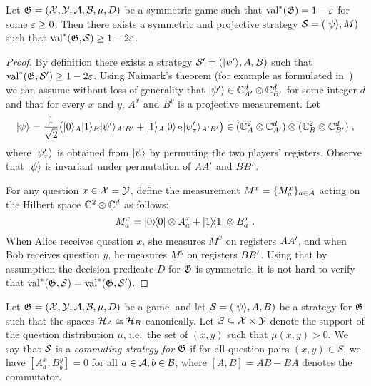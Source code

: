 \begin{lemma}
  \label{lemma-symmetric-strat}
  Let $\game = (\cal{X}, \cal{Y}, \cal{A}, \cal{B}, \mu, D)$ be a symmetric game
  such that $\val^*(\game) = 1-\eps$ for some $\eps\geq 0$.
  Then there exists a symmetric and projective strategy
  $\strategy=(\ket{\psi},M)$ such that $\val^*(\game,\strategy)\geq 1-2\eps$.
\end{lemma}

\begin{proof}
  By definition there exists a strategy $\strategy'= (\ket{\psi'},A,B)$ such
  that $\val^*(\game,\strategy')\geq 1-2\eps$.
Using Naimark's theorem (for example as formulated in~\cite[Theorem 4.2]{NW19}) we can assume
without loss of generality that $\ket{\psi'}\in\C_{\alice'}^d\otimes \C_{\bob'}^d$ for some integer $d$
  and that for every $x$ and $y$, $A^x$ and $B^y$ is a projective measurement.
  Let
  \[
    \ket{\psi} = \frac{1}{\sqrt{2}} \big( \ket{0}_\alice \ket{1}_\bob
    \ket{\psi'}_{\alice'\bob'} + \ket{1}_\alice \ket{0}_\bob
    \ket{\psi'_\tau}_{\alice'\bob'}\big) \in (\C_{\alice}^2 \otimes
    \C_{\alice'}^d) \otimes (\C_\bob^2 \otimes \C_{\bob'}^d)\;,
  \]
  where $\ket{\psi'_\tau}$ is obtained from $\ket{\psi}$ by permuting the two
  players' registers.
  Observe that $\ket{\psi}$ is invariant under permutation of $\alice\alice'$
  and $\bob\bob'$.
  
  For any question $x\in \cal{X}=\cal{Y}$, define the measurement $M^x = \{M^x_a\}_{a \in \cal{A}}$
  acting on the Hilbert space $\C^2 \otimes \C^d$ as follows:
  \[
  	M^x_a = \ketbra{0}{0} \otimes A^x_a + \ketbra{1}{1} \otimes B^x_a \;.
  \]
  When Alice receives question $x$, she measures $M^x$ on registers $\alice \alice'$, and when Bob receives 
  question $y$, he measures $M^y$ on registers $\bob \bob'$.
  Using that by assumption the decision predicate $D$ for $\game$ is symmetric,
  it is not hard to verify that $\val^*(\game,\strategy) =
  \val^*(\game,\strategy')$.
\end{proof}

\begin{definition}
  \label{def:comm-strategy}
  Let $\game = (\cal{X}, \cal{Y}, \cal{A}, \cal{B}, \mu, D)$ be a game, and let
  $\strategy = (\ket{\psi}, A, B)$ be a strategy for $\game$ such that the
  spaces $\mH_A \simeq \mH_B$ canonically.
  Let $S \subseteq \cal{X} \times \cal{Y}$ denote the support of the question
  distribution $\mu$, i.e.\ the set of $(x,y)$ such that $\mu(x,y)>0$.
  We say that $\strategy$ is a \emph{commuting strategy for $\game$} if for all
  question pairs $(x, y) \in S$, we have $[A^x_a, B^y_b] = 0$ 
  for all $a
  \in \cal{A}, b \in \cal{B}$, where $[A, B] = AB - BA$ denotes the commutator.
\end{definition}

